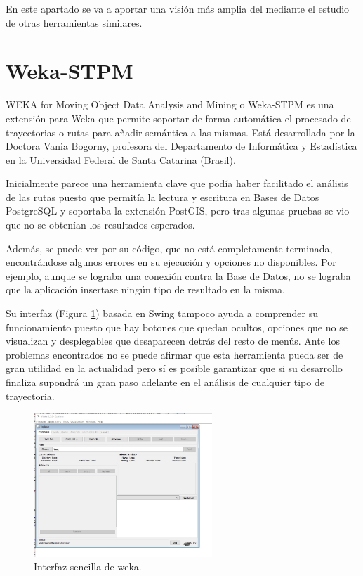 
En este apartado se va a aportar una visión más amplia del  mediante el estudio de otras herramientas similares.

\section{Weka-STPM}
WEKA for Moving Object Data Analysis and Mining o Weka-STPM \cite{weka:info} es una extensión para Weka que permite soportar de forma automática el procesado de trayectorias o rutas para añadir semántica a las mismas. Está desarrollada por la Doctora Vania Bogorny, profesora del Departamento de Informática y Estadística en la Universidad Federal de Santa Catarina (Brasil).

Inicialmente parece una herramienta clave que podía haber facilitado el análisis de las rutas puesto que permitía la lectura y escritura en Bases de Datos PostgreSQL y soportaba la extensión PostGIS, pero tras algunas pruebas se vio que no se obtenían los resultados esperados.

Además, se puede ver por su código, que no está completamente terminada, encontrándose algunos errores en su ejecución y opciones no disponibles. Por ejemplo, aunque se lograba una conexión contra la Base de Datos, no se lograba que la aplicación insertase ningún tipo de resultado en la misma.

Su interfaz (Figura \ref{weka}) basada en Swing tampoco ayuda a comprender su funcionamiento puesto que hay botones que quedan ocultos, opciones que no se visualizan y desplegables que desaparecen detrás del resto de menús. Ante los problemas encontrados no se puede afirmar que esta herramienta pueda ser de gran utilidad en la actualidad pero sí es posible garantizar que si su desarrollo finaliza supondrá un gran paso adelante en el análisis de cualquier tipo de trayectoria.

\begin{figure}[h]
  \centering
    \includegraphics[width=0.6\textwidth]{../img/weka/weka.jpg}
  \caption{Interfaz sencilla de weka.}
  \label{weka}
\end{figure}


